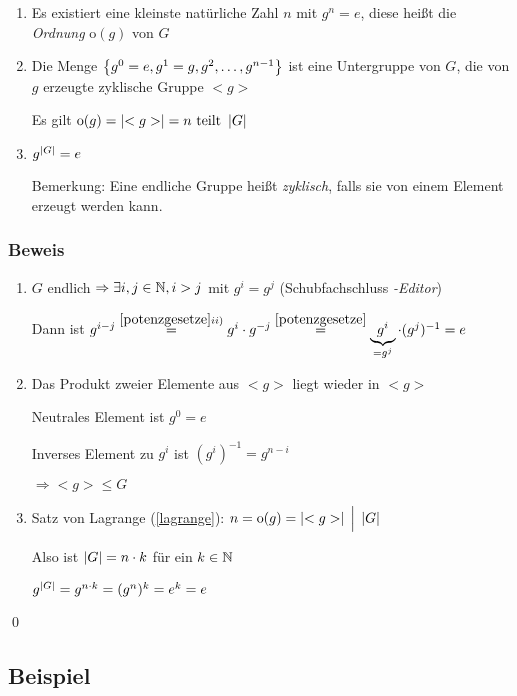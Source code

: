 {\renewcommand{\labelenumi}{(\roman{enumi})}
\begin{enumerate}
	\item
	Es existiert eine kleinste natürliche Zahl $n$ mit $g^n = e$, diese heißt die \emph{Ordnung} $\mathrm{o}(g)$ von $G$ 
	
	\item
	Die Menge $\left\{g^0 = e, g^1 = g, g^2, \dots, g^{n-1}\right\}$ ist eine Untergruppe von $G$, die von $g$ erzeugte zyklische Gruppe $<g>$
	
	Es gilt $\mathrm{o}(g) = \left|<g>\right| = n \text{ teilt } \left|G\right|$
	
	\item
	$g^{\left|G\right|} = e$
	
	Bemerkung: Eine endliche Gruppe heißt \emph{zyklisch}, falls sie von einem Element erzeugt werden kann.
\end{enumerate}

\subsubsection*{Beweis}

\begin{enumerate}
	\item
	$G$ endlich $\Rightarrow \exists i, j \in \mathbb{N}, i > j$ mit $g^i=g^j$ \quad(Schubfachschluss \emph{-Editor})
	
	Dann ist $g^{i-j} \stackrel{\ref{potenzgesetze} ii)}{=} g^i \cdot g^{-j} \stackrel{\ref{potenzgesetze}}{=}\underbrace{g^i}_{=g^j} \cdot (g^j)^{-1} = e$
	
	\item
	Das Produkt zweier Elemente aus $<g>$ liegt wieder in $<g>$
	
	Neutrales Element ist $g^0 = e$
	
	Inverses Element zu $g^i$ ist $(g^i)^{-1} = g^{n-i}$
	
	$\Rightarrow <g> \leqslant G$
	
	\item
	Satz von Lagrange (\ref{lagrange}): $n = \mathrm{o}(g)= \left|<g>\right| \;\Big|\; \left|G\right|$
	
	Also ist $\left|G\right| = n \cdot k$ für ein $k \in \mathbb{N}$
	
	$g^{\left|G\right|} = g^{n \cdot k} = (g^{n})^k = e^k = e$ 
\end{enumerate}} \qed

\subsection{Beispiel}

